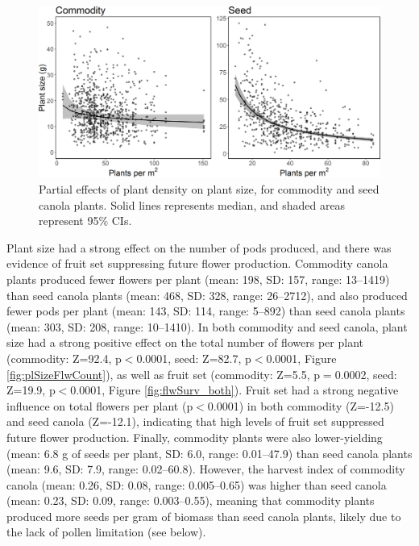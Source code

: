 \documentclass[12pt]{article} %
\begin{document}
\begin{figure} 
    \centering
    \includegraphics[width=\textwidth,keepaspectratio=true]{plDensPlSize_both.png}
    \caption[Partial effects of plant density on plant size]{Partial effects of plant density on plant size, for commodity and seed canola plants. Solid lines represents median, and shaded areas represent 95\% CIs.}
    \label{fig:plDensPlSize}
\end{figure}

Plant size had a strong effect on the number of pods produced, and there was evidence of fruit set suppressing future flower production.
Commodity canola plants produced fewer flowers per plant (mean: 198, SD: 157, range: 13--1419) than seed canola plants (mean: 468, SD: 328, range: 26--2712), and also produced fewer pods per plant (mean: 143, SD: 114, range: 5--892) than seed canola plants (mean: 303, SD: 208, range: 10--1410).
In both commodity and seed canola, plant size had a strong positive effect on the total number of flowers per plant (commodity: Z=92.4, p$<$0.0001, seed: Z=82.7, p$<$0.0001, Figure \ref{fig:plSizeFlwCount}), as well as fruit set (commodity: Z=5.5, p$=$0.0002, seed: Z=19.9, p$<$0.0001, Figure \ref{fig:flwSurv_both}).
Fruit set had a strong negative influence on total flowers per plant (p$<$0.0001) in both commodity (Z=-12.5) and seed canola (Z=-12.1), indicating that high levels of fruit set suppressed future flower production.
Finally, commodity plants were also lower-yielding (mean: 6.8 g of seeds per plant, SD: 6.0, range: 0.01--47.9) than seed canola plants (mean: 9.6, SD: 7.9, range: 0.02--60.8).
However, the harvest index of commodity canola (mean: 0.26, SD: 0.08, range: 0.005--0.65) was higher than seed canola (mean: 0.23, SD: 0.09, range: 0.003--0.55), meaning that commodity plants produced more seeds per gram of biomass than seed canola plants, likely due to the lack of pollen limitation (see below).
\end{document}
